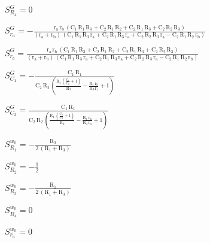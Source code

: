 \documentclass[../tc_tpfinal_main.tex]{subfiles}
\begin{document}
$S^{G}_{R_4} = 0$\par

$S^{G}_{r_a} = -\frac{\mathrm{r_a}\, \mathrm{r_b}\, \left(\mathrm{C_1}\, \mathrm{R_1}\, \mathrm{R_3} + \mathrm{C_2}\, \mathrm{R_1}\, \mathrm{R_2} + \mathrm{C_2}\, \mathrm{R_1}\, \mathrm{R_3} + \mathrm{C_2}\, \mathrm{R_2}\, \mathrm{R_3}\right)}{\left(\mathrm{r_a} + \mathrm{r_b}\right)\, \left(\mathrm{C_1}\, \mathrm{R_1}\, \mathrm{R_3}\, \mathrm{r_a} + \mathrm{C_2}\, \mathrm{R_1}\, \mathrm{R_3}\, \mathrm{r_a} + \mathrm{C_2}\, \mathrm{R_2}\, \mathrm{R_3}\, \mathrm{r_a} - \mathrm{C_2}\, \mathrm{R_1}\, \mathrm{R_2}\, \mathrm{r_b}\right)}$\par

$S^{G}_{r_b} = \frac{\mathrm{r_a}\, \mathrm{r_b}\, \left(\mathrm{C_1}\, \mathrm{R_1}\, \mathrm{R_3} + \mathrm{C_2}\, \mathrm{R_1}\, \mathrm{R_2} + \mathrm{C_2}\, \mathrm{R_1}\, \mathrm{R_3} + \mathrm{C_2}\, \mathrm{R_2}\, \mathrm{R_3}\right)}{\left(\mathrm{r_a} + \mathrm{r_b}\right)\, \left(\mathrm{C_1}\, \mathrm{R_1}\, \mathrm{R_3}\, \mathrm{r_a} + \mathrm{C_2}\, \mathrm{R_1}\, \mathrm{R_3}\, \mathrm{r_a} + \mathrm{C_2}\, \mathrm{R_2}\, \mathrm{R_3}\, \mathrm{r_a} - \mathrm{C_2}\, \mathrm{R_1}\, \mathrm{R_2}\, \mathrm{r_b}\right)}$\par

$S^{G}_{C_1} = -\frac{\mathrm{C_1}\, \mathrm{R_1}}{\mathrm{C_2}\, \mathrm{R_2}\, \left(\frac{\mathrm{R_1}\, \left(\frac{\mathrm{C_1}}{\mathrm{C_2}} + 1\right)}{\mathrm{R_2}} - \frac{\mathrm{R_1}\, \mathrm{r_b}}{\mathrm{R_3}\, \mathrm{r_a}} + 1\right)}$\par

$S^{G}_{C_2} = \frac{\mathrm{C_1}\, \mathrm{R_1}}{\mathrm{C_2}\, \mathrm{R_2}\, \left(\frac{\mathrm{R_1}\, \left(\frac{\mathrm{C_1}}{\mathrm{C_2}} + 1\right)}{\mathrm{R_2}} - \frac{\mathrm{R_1}\, \mathrm{r_b}}{\mathrm{R_3}\, \mathrm{r_a}} + 1\right)}$\par

$S^{w_0}_{R_1} = -\frac{\mathrm{R_3}}{2\, \left(\mathrm{R_1} + \mathrm{R_3}\right)}$\par

$S^{w_0}_{R_2} = - \frac{1}{2}$\par
$S^{w_0}_{R_3} = -\frac{\mathrm{R_1}}{2\, \left(\mathrm{R_1} + \mathrm{R_3}\right)}$\par

$S^{w_0}_{R_4} = 0$\par

$S^{w_0}_{r_a} = 0$\par
\end{document}
